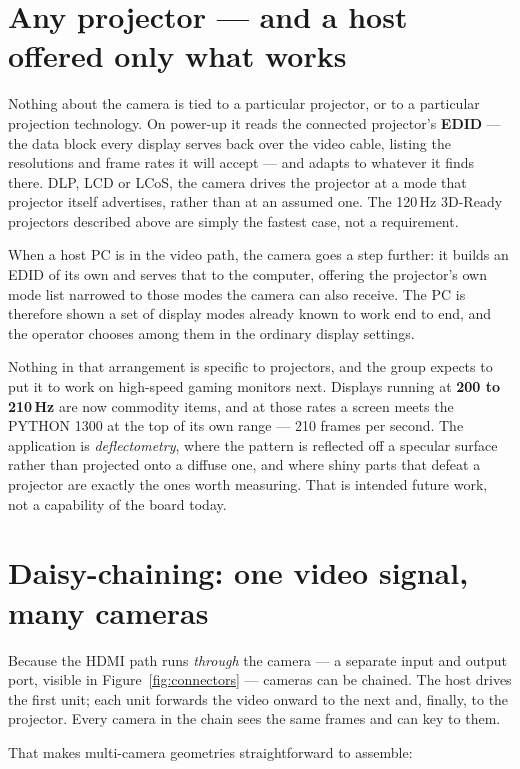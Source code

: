 \documentclass[11pt]{article}
\begin{document}
\section{Any projector --- and a host offered only what works}

Nothing about the camera is tied to a particular projector, or to a particular
projection technology. On power-up it reads the connected projector's \textbf{EDID}
--- the data block every display serves back over the video cable, listing the
resolutions and frame rates it will accept --- and adapts to whatever it finds there.
DLP, LCD or LCoS, the camera drives the projector at a mode that projector itself
advertises, rather than at an assumed one. The 120\,Hz 3D-Ready projectors described
above are simply the fastest case, not a requirement.

When a host PC is in the video path, the camera goes a step further: it builds an EDID
of its own and serves that to the computer, offering the projector's own mode list
narrowed to those modes the camera can also receive. The PC is therefore shown a set
of display modes already known to work end to end, and the operator chooses among them
in the ordinary display settings.

Nothing in that arrangement is specific to projectors, and the group expects to put it
to work on high-speed gaming monitors next. Displays running at \textbf{200 to
210\,Hz} are now commodity items, and at those rates a screen meets the PYTHON 1300 at
the top of its own range --- 210 frames per second. The application is
\emph{deflectometry}, where the pattern is reflected off a specular surface rather
than projected onto a diffuse one, and where shiny parts that defeat a projector are
exactly the ones worth measuring. That is intended future work, not a capability of
the board today.

\section{Daisy-chaining: one video signal, many cameras}

Because the HDMI path runs \emph{through} the camera --- a separate input and output
port, visible in Figure~\ref{fig:connectors} --- cameras can be chained. The host
drives the first unit; each unit forwards the video onward to the next and, finally,
to the projector. Every camera in the chain sees the same frames and can key to them.

That makes multi-camera geometries straightforward to assemble:
\end{document}
